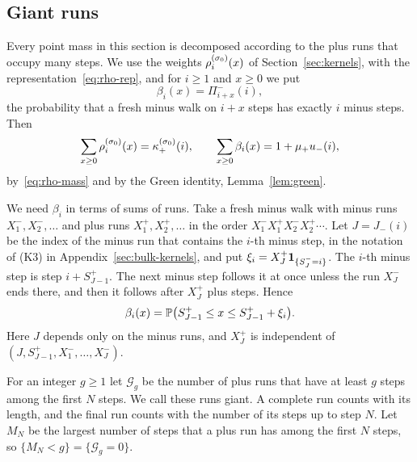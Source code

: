 \subsection{Giant runs}\label{sec:giant}

Every point mass in this section is decomposed according to the plus runs that occupy
many steps. We use the weights $\rho^{(\sigma_0)}_i(x)$ of
Section~\ref{sec:kernels}, with the representation~\eqref{eq:rho-rep}, and for
$i\ge1$ and $x\ge0$ we put
\[
 \beta_i(x)=\Pi^\minus_{i+x}(i),
\]
the probability that a fresh minus walk on $i+x$ steps has exactly $i$ minus
steps. Then
\begin{equation}\label{eq:weight-masses}
 \sum_{x\ge0}\rho^{(\sigma_0)}_i(x)=\kappa^{(\sigma_0)}_{+}(i),\qquad
 \sum_{x\ge0}\beta_i(x)=1+\mu_{+} u_{-}(i),
\end{equation}
by~\eqref{eq:rho-mass} and by the Green identity, Lemma~\ref{lem:green}.

We need $\beta_i$ in terms of sums of runs. Take a fresh minus walk with minus
runs $X^\minus_1,X^\minus_2,\dots$ and plus runs $X^\plus_1,X^\plus_2,\dots$ in the
order $X^\minus_1X^\plus_1X^\minus_2X^\plus_2\cdots$. Let $J=J_\minus(i)$ be the
index of the minus run that contains the $i$-th minus step, in the notation of
(K3) in Appendix~\ref{sec:bulk-kernels}, and put
$\xi_i=X^{+}_J\mathbf{1}_{\{S^{-}_J=i\}}$. The $i$-th minus step is step
$i+S^\plus_{J-1}$. The next minus step follows it at once unless the run
$X^\minus_J$ ends there, and then it follows after $X^\plus_J$ plus steps. Hence
\begin{equation}\label{eq:beta-rep}
 \beta_i(x)=\mathbb{P}\bigl(S^{+}_{J-1}\le x\le S^{+}_{J-1}+\xi_i\bigr).
\end{equation}
Here $J$ depends only on the minus runs, and $X^\plus_J$ is independent of
$(J,S^\plus_{J-1},X^\minus_1,\dots,X^\minus_J)$.

For an integer $g\ge1$ let $\mathcal G_g$ be the number of plus runs that have at
least $g$ steps among the first $N$ steps. We call these runs giant. A complete run
counts with its length, and the final run counts with the number of its steps up to
step $N$. Let $M_N$ be the largest number of steps that a plus run has among the
first $N$ steps, so $\{M_N<g\}=\{\mathcal G_g=0\}$.

